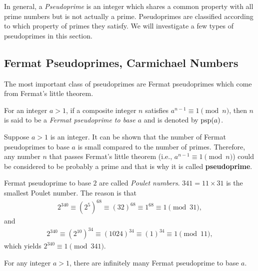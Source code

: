 \documentclass{subfile}
\begin{document}
In general, a \textit{Pseudoprime} is an integer which shares a common property with all prime numbers but is not actually a prime. Pseudoprimes are classified according to which property of primes they satisfy. We will investigate a few types of pseudoprimes in this section.

\subsection{Fermat Pseudoprimes,  Carmichael Numbers}
	The most important class of pseudoprimes are Fermat pseudoprimes which come from Fermat's little theorem. 
		\begin{definition}
			For an integer $a>1$, if a composite integer $n$ satisfies $a^{n-1}\equiv 1\pmod n$, then $n$ is said to be a \textit{Fermat pseudoprime to base $a$} and is denoted by $\operatorname{psp}(a)$.
		\end{definition}
	Suppose $a>1$ is an integer. It can be shown that the number of Fermat pseudoprimes to base $a$ is small compared to the number of primes. Therefore, any number $n$ that passes Fermat's little theorem (i.e., $a^{n-1} \equiv 1 \pmod n$) could be considered to be probably a prime and that is why it is called \textbf{pseudoprime}.

		\begin{example}
			Fermat pseudoprime to base $2$ are called \textit{Poulet numbers}. $341=11\times 31$ is the smallest Poulet number. The reason is that
				\begin{align*}
					2^{340} \equiv \left(2^5\right)^{68} \equiv (32)^{68} \equiv 1^{68} \equiv 1 \pmod{31},
				\end{align*}
			and
				\begin{align*}
					2^{340} \equiv \left(2^{10}\right)^{34} \equiv (1024)^{34} \equiv (1)^{34} \equiv 1 \pmod{11},	
				\end{align*}
			which yields $2^{340} \equiv 1 \pmod{341}$.
		\end{example}
		
	
		\begin{theorem}
			For any integer $a>1$, there are infinitely many Fermat pseudoprime to base $a$.
		\end{theorem}
		
\end{document}
